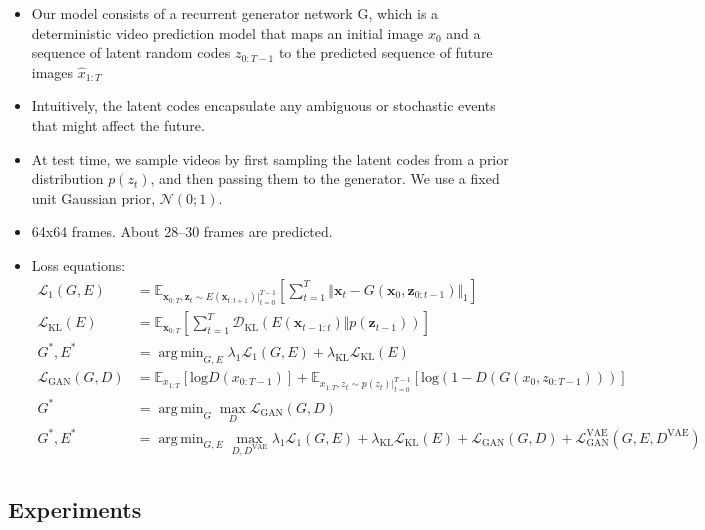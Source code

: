 \documentclass{article}
\DeclareMathOperator*{\argmin}{arg\,min}
\begin{document}
    \begin{itemize}
        \item Our model consists of a recurrent generator network G, which is a deterministic video prediction model that maps an initial image $x_0$ and a sequence of latent random codes $z_{0:T-1}$ to the predicted sequence of future images $\hat{x}_{1:T}$
        \item Intuitively, the latent codes encapsulate any ambiguous or stochastic events that might affect the future.
        \item At test time, we sample videos by first sampling the latent codes from a prior distribution $p(z_t)$, and then passing them to the generator.
        We use a fixed unit Gaussian prior, $\mathcal{N}(0; 1)$.
        \item 64x64 frames.
        About 28--30 frames are predicted.
        \item Loss equations:
        \begin{align*}
            \mathcal{L}_1(G,E) &= \mathbb{E}_{\textbf{x}_{0:T}, \textbf{z}_t \sim \textit{E}(\textbf{x}_{t:t+1}) \vert_{t=0}^{T-1}} \left[ \sum_{t=1}^{T} \Vert \textbf{x}_t - G(\textbf{x}_0, \textbf{z}_{0:t-1}) \Vert_1 \right] \\
            \mathcal{L}_{\textrm{KL}}(E) &= \mathbb{E}_{\textbf{x}_{0:T}} \left[ \sum_{t=1}^{T} \mathcal{D}_{\textrm{KL}}(\textit{E}(\textbf{x}_{t-1:t}) \Vert p(\textbf{z}_{t-1})) \right] \\
            G^*, E^* &= \argmin_{G,E} \lambda_1 \mathcal{L}_1(G,E) + \lambda_{\textrm{KL}} \mathcal{L}_{\textrm{KL}}(\textit{E}) \\
            \mathcal{L}_{\textrm{GAN}}(G,D) &= \mathbb{E}_{x_{1:T}}\left[ \textrm{log} D(x_{0:T-1}) \right] + \mathbb{E}_{x_{1:T}, z_t \sim p(z_t) \vert_{t=0}^{T-1}} \left[ \textrm{log} (1-D(G(x_0, z_{0:T-1})))\right] \\
            G^* &= \argmin_G \max_D \mathcal{L}_{\textrm{GAN}}(G,D) \\
            G^*, E^* &= \argmin_{G,E} \max_{D, D^{\textrm{VAE}}} \lambda_1 \mathcal{L}_1(G,E) + \lambda_{\textrm{KL}} \mathcal{L}_{\textrm{KL}}(E) + \mathcal{L}_{\textrm{GAN}}(G,D) + \mathcal{L}_{\textrm{GAN}}^{\textrm{VAE}}(G,E,D^{\textrm{VAE}}) \\
        \end{align*}
    \end{itemize}

    \subsection{Experiments}\label{subsec:Stochastic_Adversarial_Video_Prediction_(SAVP):experiments}
\end{document}

